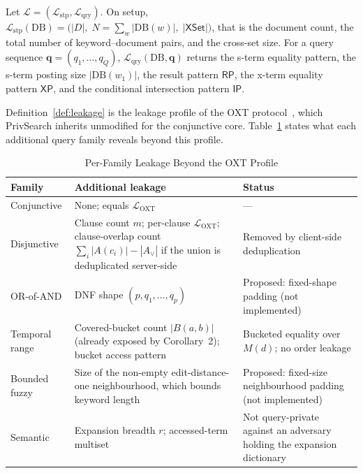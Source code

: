 \begin{definition}
\label{def:leakage}
Let $\mathcal{L} = (\mathcal{L}_{\mathrm{stp}}, \mathcal{L}_{\mathrm{qry}})$.
On setup, $\mathcal{L}_{\mathrm{stp}}(\mathrm{DB}) =
\bigl(|D|,\; N = \sum_{w} |\mathrm{DB}(w)|,\; |\mathsf{XSet}|\bigr)$,
that is the document count, the total number of keyword--document pairs, and
the cross-set size. For a query sequence
$\mathbf{q} = (q_1,\dots,q_Q)$, $\mathcal{L}_{\mathrm{qry}}(\mathrm{DB},\mathbf{q})$
returns the s-term equality pattern, the s-term posting size
$|\mathrm{DB}(w_1)|$, the result pattern $\mathsf{RP}$, the x-term equality
pattern $\mathsf{XP}$, and the conditional intersection pattern $\mathsf{IP}$.
\end{definition}

Definition~\ref{def:leakage} is the leakage profile of the OXT protocol~\cite{Cash}, which PrivSearch inherits unmodified for the conjunctive core. Table~\ref{tab:leakage} states what each additional query family reveals beyond this profile.

\begin{table}[!t]
\caption{Per-Family Leakage Beyond the OXT Profile}
\label{tab:leakage}
\centering
\footnotesize
\setlength{\tabcolsep}{3pt}
\renewcommand{\arraystretch}{1.15}
\begin{tabular}{p{1.55cm}p{3.1cm}p{2.8cm}}
\toprule
\textbf{Family} & \textbf{Additional leakage} & \textbf{Status} \\
\midrule
Conjunctive & None; equals $\mathcal{L}_{\mathrm{OXT}}$ & --- \\
Disjunctive & Clause count $m$; per-clause $\mathcal{L}_{\mathrm{OXT}}$;
  clause-overlap count $\sum_i |A(c_i)| - |A_{\vee}|$ if the union is
  deduplicated server-side & Removed by client-side deduplication \\
OR-of-AND & DNF shape $(p, q_1,\dots,q_p)$ & Proposed: fixed-shape padding (not implemented) \\
Temporal range & Covered-bucket count $|B(a,b)|$ (already exposed by
  Corollary~2); bucket access pattern & Bucketed equality over $M(d)$;
  no order leakage \\
Bounded fuzzy & Size of the non-empty edit-distance-one neighbourhood, which bounds keyword length & Proposed: fixed-size neighbourhood padding (not implemented) \\
Semantic & Expansion breadth $r$; accessed-term multiset & Not query-private
  against an adversary holding the expansion dictionary \\
\bottomrule
\end{tabular}
\end{table}

